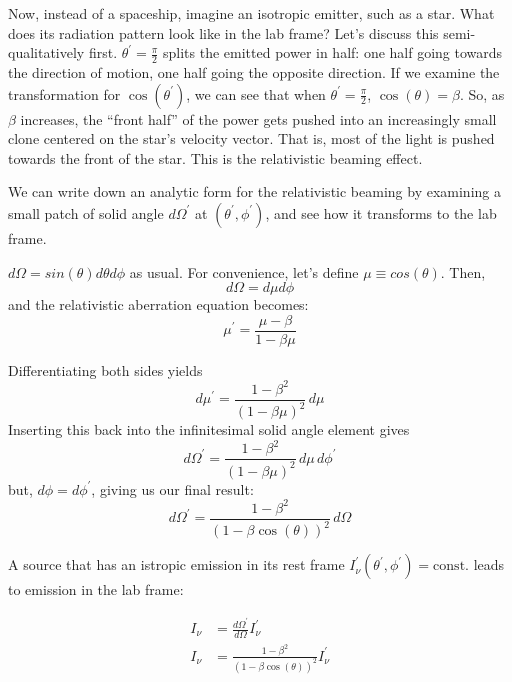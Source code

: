 \documentclass{article}
\begin{document}
Now, instead of a spaceship, imagine an isotropic emitter, such as a star.  What does its radiation pattern look like in the lab frame?  Let's discuss this semi-qualitatively first.  $\theta^\prime = \frac{\pi}{2}$ splits the emitted power in half: one half going towards the direction of motion, one half going the opposite direction.  If we examine the transformation for $\cos\left(\theta^\prime\right)$, we can see that when $\theta^\prime = \frac{\pi}{2}$, $\cos\left(\theta\right) = \beta$.  So, as $\beta$ increases, the ``front half'' of the power gets pushed into an increasingly small clone centered on the star's velocity vector.  That is, most of the light is pushed towards the front of the star.  This is the relativistic beaming effect.

We can write down an analytic form for the relativistic beaming by examining a small patch of solid angle $d\Omega^\prime$ at $(\theta^\prime, \phi^\prime)$, and see how it transforms to the lab frame.

$d\Omega = sin(\theta) d\theta d\phi$ as usual.  For convenience, let's define $\mu \equiv cos(\theta)$.  Then,
\begin{equation}
  d\Omega = d\mu d\phi
\end{equation}
and the relativistic aberration equation becomes:
\begin{equation}
  \mu^\prime = \frac{\mu - \beta}{1 - \beta \mu}
\end{equation}

Differentiating both sides yields
\begin{equation}
  d\mu^\prime = \frac{1 - \beta^2}{\left(1 - \beta \mu\right)^2}\, d\mu
\end{equation}
Inserting this back into the infinitesimal solid angle element gives
\begin{equation}
  d\Omega^\prime = \frac{1 - \beta^2}{\left(1 - \beta \mu\right)^2}\, d\mu\, d\phi^\prime
\end{equation}
but, $d\phi = d\phi^\prime$, giving us our final result:
\begin{equation}
  d\Omega^\prime = \frac{1 - \beta^2}{\left(1 - \beta \cos\left(\theta\right)\right)^2}\, d\Omega
\end{equation}

A source that has an istropic emission in its rest frame $I^\prime_\nu\left(\theta^\prime, \phi^\prime\right) = \mathrm{const.}$ leads to emission in the lab frame:

\begin{align}
  I_\nu &= \frac{d\Omega^\prime}{d\Omega} I^\prime_\nu
  \\
  I_\nu &= \frac{1 - \beta^2}{\left(1 - \beta \cos\left(\theta\right)\right)^2} I^\prime_\nu
\end{align}
\end{document}
